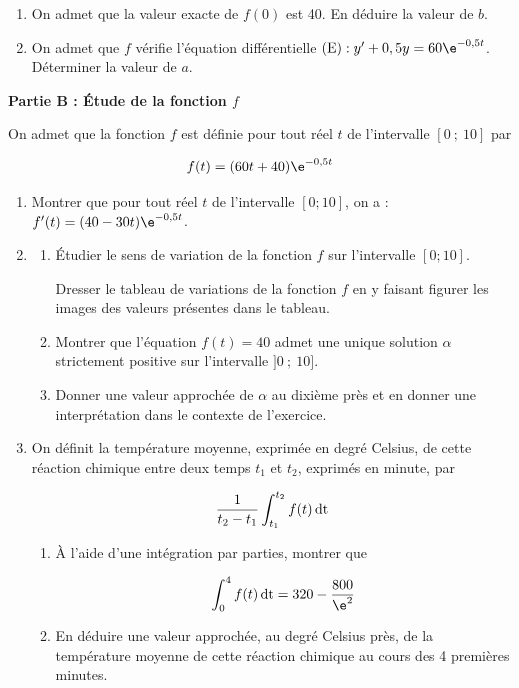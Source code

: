 \begin{enumerate}[start=2]
	\item On admet que la valeur exacte de $f(0)$ est 40. En déduire la valeur de $b$.
	\item On admet que $f$ vérifie l'équation différentielle $(\mathrm{E}): y'+ 0,5 y= 60 \e^{-0,5 t}$. Déterminer la valeur de $a$.
\end{enumerate}
\medskip 

\textbf{Partie B : Étude de la fonction $f$}
\medskip 

On admet que la fonction $f$ est définie pour tout réel $t$ de l'intervalle $[0~;~10]$ par

\[f(t) = (60 t+ 40)\e^{-0,5 t}\]

\smallskip

\begin{enumerate}
\item Montrer que pour tout réel $t$ de l'intervalle $[0 ; 10]$, on a : $f'(t)=(40-30 t) \e^{-0,5 t}$.
\item
	\begin{enumerate}
		\item Étudier le sens de variation de la fonction $f$ sur l'intervalle $[0 ; 10]$.


Dresser le tableau de variations de la fonction $f$ en y faisant figurer les images des valeurs présentes dans le tableau.

		\item Montrer que l'équation $f(t) = 40$ admet une unique solution $\alpha$ strictement positive sur l'intervalle $]0~;~10]$.
		\item Donner une valeur approchée de $\alpha$ au dixième près et en donner une interprétation dans le contexte de l'exercice.
	\end{enumerate}
\item On définit la température moyenne, exprimée en degré Celsius, de cette réaction chimique entre deux temps $t_{1}$ et $t_{2}$, exprimés en minute, par

\[\dfrac{1}{t_{2}-t_{1}} \int_{t_{1}}^{t_{2}} f(t)\,\rm{d} t\]

	\begin{enumerate}
		\item À l'aide d'une intégration par parties, montrer que

\[\int_{0}^{4} f(t) \, \rm{d}t=320-\dfrac{800}{\e^{2}}\]

		\item En déduire une valeur approchée, au degré Celsius près, de la température moyenne de cette réaction chimique au cours des 4 premières minutes.
	\end{enumerate}
\end{enumerate}
